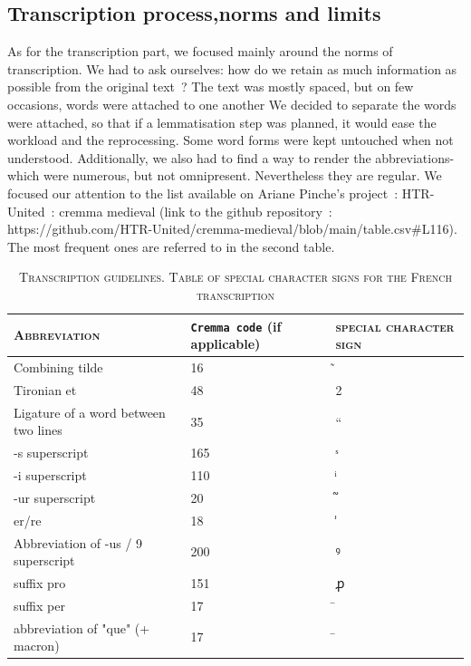 \documentclass[12pt]{article}
\begin{document}
\subsection{Transcription process,norms and limits}

As for the transcription part, we focused mainly around the norms of transcription. We had to ask ourselves: how do we retain as much  information as possible from the original text ? The text was mostly spaced, but on few occasions, words were attached to one another We decided to separate the words were attached, so that if a lemmatisation step was planned, it would ease the workload and the reprocessing. Some word forms were kept untouched when not understood. Additionally, we also had to find a way to render the abbreviations- which were numerous, but not omnipresent. Nevertheless they are regular. We focused our attention to the list available on Ariane Pinche’s project : HTR-United : cremma medieval (link to the github repository : https://github.com/HTR-United/cremma-medieval/blob/main/table.csv\#L116). The most frequent ones are referred to in the second table. 

\begin{table}[!h]
\centering
\begin{tabularx}{\textwidth}{| X | X | X |}\hline
\textsc{Abbreviation}     & \texttt{Cremma code} (if applicable)    & \textsc{special character sign}  \\ \hline\hline
Combining tilde & 16 & ̃  \\\hline
Tironian et & 48 & 2 & \\\hline
Ligature of a word between two lines & 35 & “ & \\\hline
-s superscript & 165 & ˢ \\\hline
-i superscript &  110 & ͥ \\\hline
-ur superscript & 20 & ᷑ \\\hline
er/re & 18 & ̾\\\hline
Abbreviation of -us / 9 superscript & 200 & ꝰ \\\hline
suffix pro & 151 & ꝓ \\\hline
suffix per & 17 & ̄  \\\hline
abbreviation of "que" (+ macron) & 17 & ̄  \\\hline

\end{tabularx}

\caption{\textsc{Transcription guidelines. Table of special character signs for the French transcription}}
\label{table:1}
\end{table}
\end{document}
